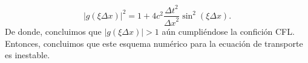 \begin{frame}
\begin{example}
        \begin{equation*}
            \left|
            g
            \left(\xi\Delta x\right)
            \right|^{2}=
            1+
            4c^{2}
            \frac{{\Delta t}^{2}}{{\Delta x}^{2}}
            \sin^{2}
            \left(\xi\Delta x\right).
        \end{equation*}
        De donde, concluimos que
        \begin{math}
            \left|
            g\left(\xi\Delta x\right)
            \right|>
            1
        \end{math}
        aún cumpliéndose la confición CFL.
        Entonces, concluimos que este esquema numérico para la ecuación de
        transporte es inestable.
    \end{example}
\end{frame}